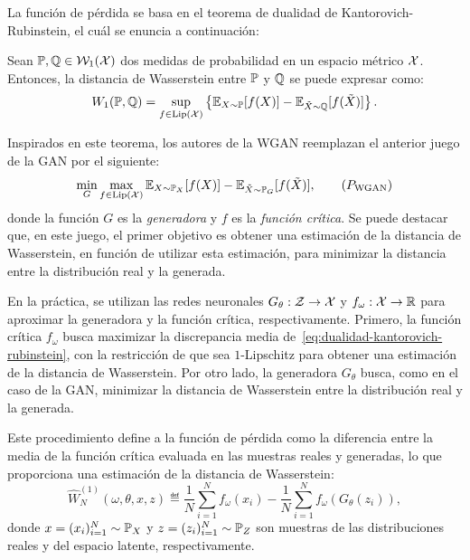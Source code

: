 La función de pérdida se basa en el teorema de dualidad de Kantorovich-Rubinstein, el cuál se enuncia a continuación:
\begin{theorem}\label{thm:dualidad-kantorovich-rubinstein}
    Sean $\Prob, \ProbQ \in \WassersteinSpace[1]{\cX}$ dos medidas de probabilidad en un espacio métrico $\mathcal{X}$. Entonces, la distancia de Wasserstein entre $\Prob$ y $\ProbQ$ se puede expresar como:
    \begin{equation}\label{eq:dualidad-kantorovich-rubinstein}
        \Wasserstein[1]{\Prob}{\ProbQ} = \sup_{f \in \Lip[\cX]} \left\{ \Exp_{X\sim \Prob} [f(X)] - \Exp_{\tilde X \sim \ProbQ} [f(\tilde X)] \right\}.
    \end{equation}
\end{theorem}

Inspirados en este teorema, los autores de la WGAN \cite{arjovsky2017wasserstein} reemplazan el anterior juego de la GAN por el siguiente:
\begin{equation}\label{eq:wgan-game}

    \min_{G} \max_{f \in \Lip[\cX]} \Exp_{X\sim \Prob_X} [f(X)] - \Exp_{\tilde X \sim \Prob_G} [f(\tilde X)],\tag{$P_{\mathrm{WGAN}}$}

\end{equation}
donde la función $G$ es la \textit{generadora} y $f$ es la \textit{función crítica}. Se puede destacar que, en este juego, el primer objetivo es obtener una estimación de la distancia de Wasserstein, en función de utilizar esta estimación, para minimizar la distancia entre la distribución real y la generada.

En la práctica, se utilizan las redes neuronales $G_\theta: \mathcal{Z} \to \mathcal{X}$ y $f_\omega: \mathcal{X} \to \mathbb{R}$ para aproximar la generadora y la función crítica, respectivamente.
Primero, la función crítica $f_\omega$ busca maximizar la discrepancia media de~\eqref{eq:dualidad-kantorovich-rubinstein}, con la restricción de que sea $1$-Lipschitz para obtener una estimación de la distancia de Wasserstein. Por otro lado, la generadora $G_\theta$ busca, como en el caso de la GAN, minimizar la distancia de Wasserstein entre la distribución real y la generada.

Este procedimiento define a la función de pérdida como
la diferencia entre la media de la función crítica evaluada en las muestras reales y generadas, lo que proporciona una estimación de la distancia de Wasserstein:
\begin{equation}\label{eq:wasserstein-estimation}
    \widehat W_N^{(1)} (
    \omega, \theta, x, z
    )
    \eqdef \frac{1}{N}\sum_{i=1}^{N} f_\omega(x_i) - \frac{1}{N}\sum_{i=1}^{N} f_\omega(G_\theta(z_i)),
\end{equation}
donde $x = (x_i)_{i=1}^{N} \sim \Prob_X$ y $z = (z_i)_{i=1}^{N} \sim \Prob_Z$ son muestras de las distribuciones reales y del espacio latente, respectivamente.

